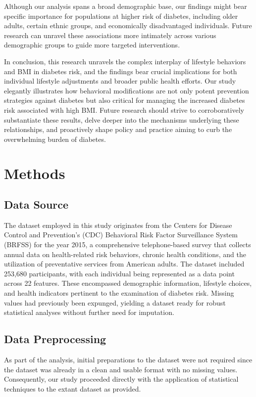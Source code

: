 \documentclass[11pt]{article}
\begin{document}
Although our analysis spans a broad demographic base, our findings might bear specific importance for populations at higher risk of diabetes, including older adults, certain ethnic groups, and economically disadvantaged individuals. Future research can unravel these associations more intimately across various demographic groups to guide more targeted interventions.

In conclusion, this research unravels the complex interplay of lifestyle behaviors and BMI in diabetes risk, and the findings bear crucial implications for both individual lifestyle adjustments and broader public health efforts. Our study elegantly illustrates how behavioral modifications are not only potent prevention strategies against diabetes but also critical for managing the increased diabetes risk associated with high BMI. Future research should strive to corroboratively substantiate these results, delve deeper into the mechanisms underlying these relationships, and proactively shape policy and practice aiming to curb the overwhelming burden of diabetes.

\section*{Methods}

\subsection*{Data Source}
The dataset employed in this study originates from the Centers for Disease Control and Prevention's (CDC) Behavioral Risk Factor Surveillance System (BRFSS) for the year 2015, a comprehensive telephone-based survey that collects annual data on health-related risk behaviors, chronic health conditions, and the utilization of preventative services from American adults. The dataset included 253,680 participants, with each individual being represented as a data point across 22 features. These encompassed demographic information, lifestyle choices, and health indicators pertinent to the examination of diabetes risk. Missing values had previously been expunged, yielding a dataset ready for robust statistical analyses without further need for imputation.

\subsection*{Data Preprocessing}
As part of the analysis, initial preparations to the dataset were not required since the dataset was already in a clean and usable format with no missing values. Consequently, our study proceeded directly with the application of statistical techniques to the extant dataset as provided.
\end{document}
